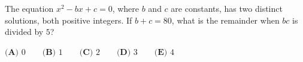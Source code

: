 The equation $x^2-bx+c=0$, where $b$ and $c$ are constants, has two distinct solutions, both positive integers. If $b+c=80$, what is the remainder when $bc$ is divided by $5$?

$\textbf{(A) }0\qquad\textbf{(B) }1\qquad\textbf{(C) }2\qquad\textbf{(D) }3\qquad\textbf{(E) }4$
